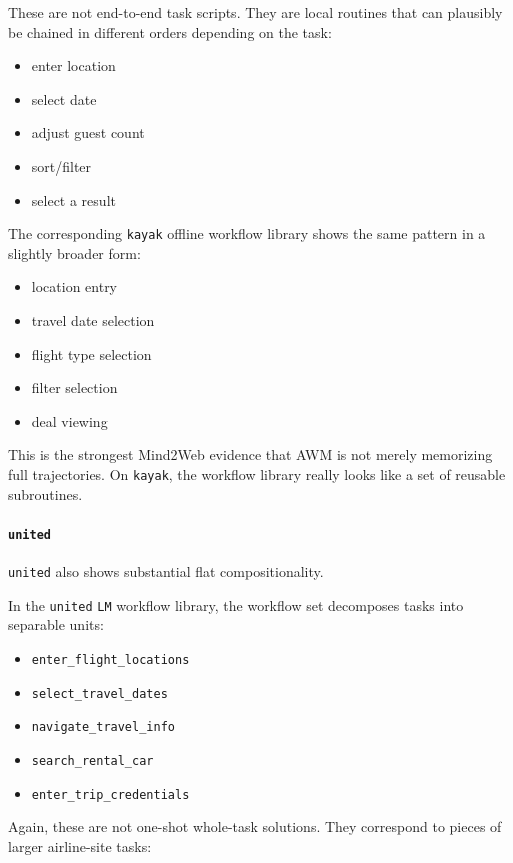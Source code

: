 These are not end-to-end task scripts. They are local routines that can
plausibly be chained in different orders depending on the task:

\begin{itemize}
\tightlist
\item
  enter location
\item
  select date
\item
  adjust guest count
\item
  sort/filter
\item
  select a result
\end{itemize}

The corresponding \texttt{kayak} offline workflow library shows the same
pattern in a slightly broader form:

\begin{itemize}
\tightlist
\item
  location entry
\item
  travel date selection
\item
  flight type selection
\item
  filter selection
\item
  deal viewing
\end{itemize}

This is the strongest Mind2Web evidence that AWM is not merely
memorizing full trajectories. On \texttt{kayak}, the workflow library
really looks like a set of reusable subroutines.

\paragraph{\texorpdfstring{\texttt{united}}{united}}

\texttt{united} also shows substantial flat compositionality.

In the \texttt{united} \texttt{LM} workflow library,
the workflow set decomposes tasks into separable units:

\begin{itemize}
\tightlist
\item
  \texttt{enter\_flight\_locations}
\item
  \texttt{select\_travel\_dates}
\item
  \texttt{navigate\_travel\_info}
\item
  \texttt{search\_rental\_car}
\item
  \texttt{enter\_trip\_credentials}
\end{itemize}

Again, these are not one-shot whole-task solutions. They correspond to
pieces of larger airline-site tasks:

